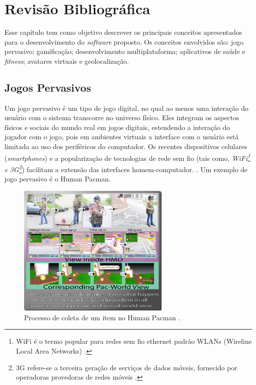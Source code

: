 \chapter{Revisão Bibliográfica} \label{cap:revbib}
Esse capítulo tem como objetivo descrever os principais conceitos apresentados para o desenvolvimento do \textit{software} proposto. Os conceitos envolvidos são: jogo pervasivo; gamificação; desenvolvimento multiplataforma; aplicativos de saúde e \textit{fitness}; avatares virtuais e geolocalização.

\section{Jogos Pervasivos}
Um jogo pervasivo é um tipo de jogo digital, no qual ao menos uma interação do usuário com o sistema transcorre no universo físico. Eles integram os aspectos físicos e sociais do mundo real em jogos digitais, estendendo a interação do jogador com o jogo, pois em ambientes virtuais a interface com o usuário está limitada ao uso dos periféricos do computador. Os recentes dispositivos celulares (\textit{smartphones}) e a popularização de tecnologias de rede sem fio 
(tais como, \textit{WiFi\footnote{WiFi é o termo popular para redes sem fio ethernet padrão  WLANs (Wireline Local Area Networks) \cite{lehr2003}.} e 3G\footnote{3G refere-se a terceira geração de serviços de dados móveis, fornecido por operadoras provedoras de redes móveis \cite{lehr2003}.}}) facilitam a extensão das interfaces homem-computador. \cite{magerkurth2005, vianna2013}. Um exemplo de jogo pervasivo é o Human Pacman. \par

\begin{figure}[h]
    \caption[Processo de coleta de um item no Human Pacman]{Processo de coleta de um item no Human Pacman \cite{cheok2003}.}
    \centerline{\includegraphics[width=20em]{figuras/humanpacman.png}}
    \label{fig:humanpacman}
\end{figure}

